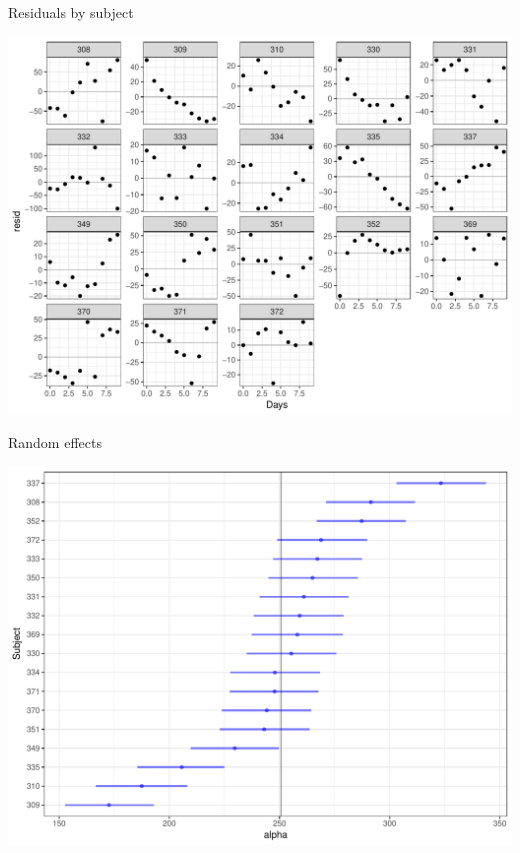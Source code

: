 \documentclass[11pt,ignorenonframetext,]{beamer}
\begin{document}
\begin{frame}{Residuals by subject}

\includegraphics{Lec5_files/figure-beamer/unnamed-chunk-19-1.pdf}

\end{frame}

\begin{frame}{Random effects}

\includegraphics{Lec5_files/figure-beamer/unnamed-chunk-20-1.pdf}

\end{frame}
\end{document}
